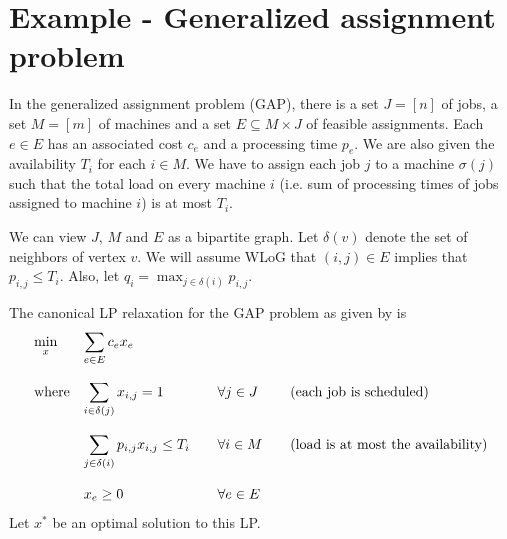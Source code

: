 \section{Example - Generalized assignment problem}

In the generalized assignment problem (GAP), there is a set $J = [n]$ of jobs, a set
$M = [m]$ of machines and a set $E \subseteq M \times J$ of feasible assignments.
Each $e \in E$ has an associated cost $c_e$ and a processing time $p_e$.
We are also given the availability $T_i$ for each $i \in M$.
We have to assign each job $j$ to a machine $\sigma(j)$ such that
the total load on every machine $i$ (i.e. sum of processing times of jobs assigned to machine $i$)
is at most $T_i$.

We can view $J$, $M$ and $E$ as a bipartite graph.
Let $\delta(v)$ denote the set of neighbors of vertex $v$.
We will assume WLoG that $(i, j) \in E$ implies that $p_{i,j} \le T_i$.
Also, let $q_i = \max_{j \in \delta(i)} p_{i,j}$.

The canonical LP relaxation for the GAP problem as given by \cite{lrs-book} is
\[ \begin{array}{*4{>{\displaystyle}l}}
\min_x & \sum_{e \in E}{c_e}{x_e} & &
\\ \\ \textrm{where} & \sum_{i \in \delta(j)} x_{i,j} = 1 & \quad \forall j \in J
& \quad \textrm{(each job is scheduled)}
\\ \\ & \sum_{j \in \delta(i)} p_{i,j} x_{i,j} \le T_i & \quad \forall i \in M
& \quad \textrm{(load is at most the availability)}
\\ \\ & x_e \ge 0 & \quad \forall e \in E
\end{array} \]
Let $x^*$ be an optimal solution to this LP.




